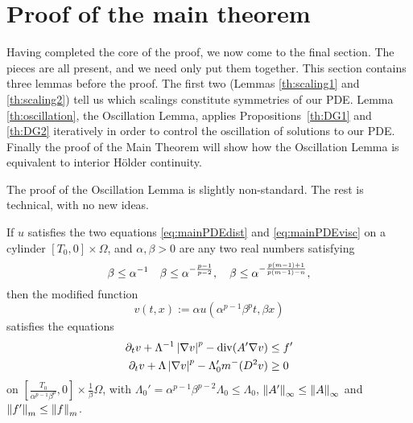 \section{Proof of the main theorem} \label{sec:main}

Having completed the core of the proof, we now come to the final section.  The pieces are all present, and we need only put them together.  This section contains three lemmas before the proof.  The first two (Lemmas \ref{th:scaling1} and \ref{th:scaling2}) tell us which scalings constitute symmetries of our PDE.  Lemma \ref{th:oscillation}, the Oscillation Lemma, applies Propositions~\ref{th:DG1} and \ref{th:DG2} iteratively in order to control the oscillation of solutions to our PDE.  Finally the proof of the Main Theorem will show how the Oscillation Lemma is equivalent to interior H\"{o}lder continuity.  

The proof of the Oscillation Lemma is slightly non-standard.  The rest is technical, with no new ideas.  

\begin{lemma} \label{th:scaling1}
 If $u$ satisfies the two equations \eqref{eq:mainPDEdist} and \eqref{eq:mainPDEvisc} on a cylinder $[T_0,0]\times\Omega$, and $\alpha,\beta > 0$ are any two real numbers satisfying 
\[ \beta \leq \alpha^{-1} \quad \beta \leq \alpha^{-\frac{p-1}{p-2}}, \quad \beta \leq \alpha^{-\frac{p(m-1)+1}{p(m-1) - n} } , \]
then the modified function 
\[ v(t,x) := \alpha u(\alpha^{p-1}\beta^p t, \beta x)\] 
satisfies the equations
\begin{align*}
\partial_t v + \Lambda^{-1} \left\lvert \nabla v \right\rvert^p - \operatorname{div}(A' \nabla v) &\leq f' \\
\partial_t v + \Lambda \left\lvert \nabla v \right\rvert^p - \Lambda_0' m^-(D^2 v)  &\geq 0
\end{align*}
on $\left[ \frac{T_0}{\alpha^{p-1}\beta^p},0\right] \times \frac{1}{\beta} \Omega$, with $\Lambda_0' = \alpha^{p-1}\beta^{p-2} \Lambda_0 \leq \Lambda_0$, $\left\lVert A'\right\rVert_\infty \leq \left\lVert A\right\rVert_\infty$ and $\left\lVert f'\right\rVert_m \leq \left\lVert f\right\rVert_m$.
\end{lemma}

